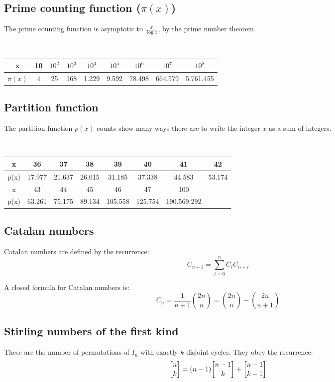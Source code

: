 \subsection{Prime counting function ($\pi(x)$)} The prime counting function is asymptotic to $\frac{x}{\log x}$, by the prime number theorem.

\

\begin{tabular}{|c|c|c|c|c|c|c|c|c|}
    \hline
    x&10&$10^2$&$10^3$&$10^4$&$10^5$&$10^6$&$10^7$&$10^8$\\ \hline
    $\pi(x)$&4&25&168&1.229&9.592&78.498&664.579&5.761.455\\ \hline
\end{tabular}

\subsection{Partition function} The partition function $p(x)$ counts show many ways there are to write the integer $x$ as a sum of integers.

\

\begin{tabular}{|c|c|c|c|c|c|c|c|}
    \hline
    x&36&37&38&39&40&41&42 \\ \hline
    p(x)&17.977&21.637&26.015&31.185&37.338&44.583&53.174 \\ \hline\hline
    x&43&44&45&46&47&100& \\ \hline
    p(x)&63.261&75.175&89.134&105.558&125.754&190.569.292& \\ \hline
\end{tabular}

\subsection{Catalan numbers} Catalan numbers are defined by the recurrence:
\begin{equation*}
    C_{n+1} = \sum_{i=0}^nC_iC_{n-i}
\end{equation*}

A closed formula for Catalan numbers is:
\begin{equation*}
    C_n = \frac{1}{n+1}\binom{2n}{n} = \binom{2n}{n} - \binom{2n}{n+1}
\end{equation*}

\subsection{Stirling numbers of the first kind} These are the number of permutations of $I_n$ with exactly $k$ disjoint cycles. They obey the recurrence:
\begin{equation*}
    \stirlingfirst{n}{k} = (n-1)\stirlingfirst{n-1}{k} + \stirlingfirst{n-1}{k-1}
\end{equation*}

